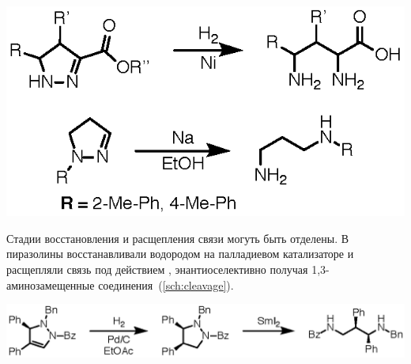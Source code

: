 \begin{scheme}
    \centering
    \includegraphics{sections/literature/img/hydrogen_reduction.eps}
    \caption{}
    \label{sch:hydrogen_reduction}
\end{scheme}

Стадии восстановления и расщепления связи  могуть быть отделены.
В~\cite{Hashimoto2013} пиразолины восстанавливали водородом на палладиевом катализаторе и расщепляли связь  под действием , энантиоселективно получая 1,3-аминозамещенные соединения~(\ref{sch:cleavage}).

\begin{scheme}
    \centering
    \includegraphics{sections/literature/img/cleavage.eps}
    \caption{}
    \label{sch:cleavage}
\end{scheme}